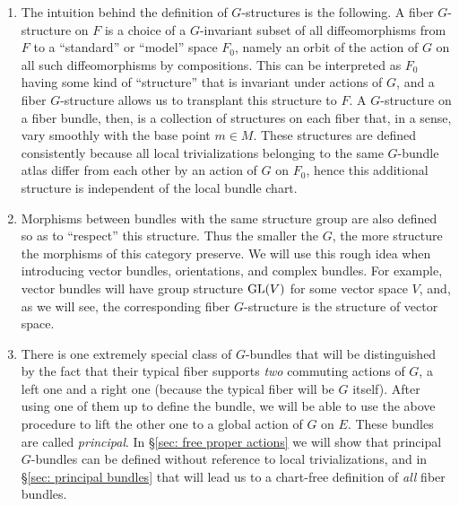 \begin{rem}
    \begin{enumerate}
        \item The intuition behind the definition of $G$-structures is the following. A fiber $G$-structure on $F$ is a choice of a $G$-invariant subset of all diffeomorphisms from $F$ to a ``standard'' or ``model'' space $F_0$, namely an orbit of the action of $G$ on all such diffeomorphisms by compositions. This can be interpreted as $F_0$ having some kind of ``structure'' that is invariant under actions of $G$, and a fiber $G$-structure allows us to transplant this structure to $F$. A $G$-structure on a fiber bundle, then, is a collection of structures on each fiber that, in a sense, vary smoothly with the base point $m\in M$. These structures are defined consistently because all local trivializations belonging to the same $G$-bundle atlas differ from each other by an action of $G$ on $F_0$, hence this additional structure is independent of the local bundle chart. 
        \item Morphisms between bundles with the same structure group are also defined so as to ``respect'' this structure. Thus the smaller the $G$, the more structure the morphisms of this category preserve. We will use this rough idea when introducing vector bundles, orientations, and complex bundles. For example, vector bundles will have group structure $\operatorname{GL}(V)$ for some vector space $V$, and, as we will see, the corresponding fiber $G$-structure is the structure of vector space.
        
        \item There is one extremely special class of $G$-bundles that will be distinguished by the fact that their typical fiber supports \emph{two} commuting actions of $G$, a left one and a right one (because the typical fiber will be $G$ itself). After using one of them up to define the bundle, we will be able to use the above procedure to lift the other one to a global action of $G$ on $E$. These bundles are called \emph{principal}. In \S\ref{sec: free proper actions} we will show that principal $G$-bundles can be defined without reference to local trivializations, and in \S\ref{sec: principal bundles} that will lead us to a chart-free definition of \emph{all} fiber bundles.
    \end{enumerate}
\end{rem}
